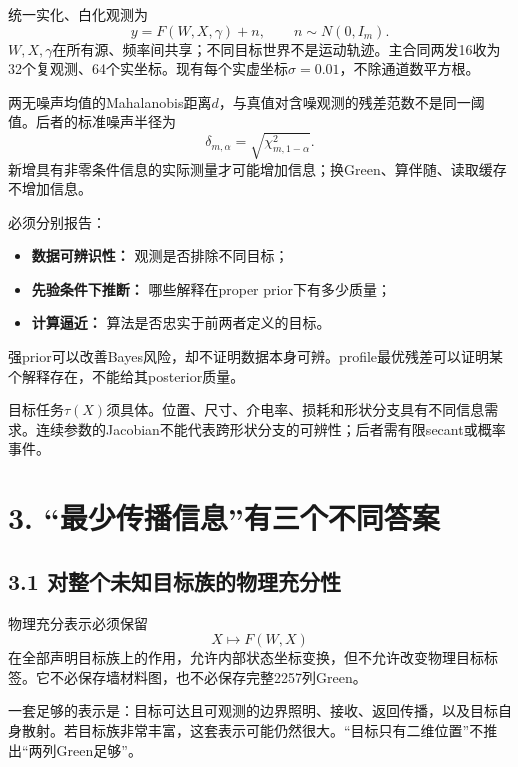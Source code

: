 \documentclass[
  10pt,
  a4paper,
]{article}
\providecommand{\tightlist}{%
  \setlength{\itemsep}{0pt}\setlength{\parskip}{0pt}}
\providecommand{\tightlist}{\setlength{\itemsep}{1pt}\setlength{\parskip}{1pt}}
\begin{document}
统一实化、白化观测为 \[
y=F(W,X,\gamma)+n,\qquad n\sim N(0,I_m).
\]
\(W,X,\gamma\)在所有源、频率间共享；不同目标世界不是运动轨迹。主合同两发16收为32个复观测、64个实坐标。现有每个实虚坐标\(\sigma=0.01\)，不除通道数平方根。

两无噪声均值的Mahalanobis距离\(d\)，与真值对含噪观测的残差范数不是同一阈值。后者的标准噪声半径为
\[
\delta_{m,\alpha}=\sqrt{\chi^2_{m,1-\alpha}}.
\]
新增具有非零条件信息的实际测量才可能增加信息；换Green、算伴随、读取缓存不增加信息。

必须分别报告：

\begin{itemize}
\tightlist
\item
  \textbf{数据可辨识性：} 观测是否排除不同目标；
\item
  \textbf{先验条件下推断：} 哪些解释在proper prior下有多少质量；
\item
  \textbf{计算逼近：} 算法是否忠实于前两者定义的目标。
\end{itemize}

强prior可以改善Bayes风险，却不证明数据本身可辨。profile最优残差可以证明某个解释存在，不能给其posterior质量。

目标任务\(\tau(X)\)须具体。位置、尺寸、介电率、损耗和形状分支具有不同信息需求。连续参数的Jacobian不能代表跨形状分支的可辨性；后者需有限secant或概率事件。

\hypertarget{ux6700ux5c11ux4f20ux64adux4fe1ux606fux6709ux4e09ux4e2aux4e0dux540cux7b54ux6848}{%
\section{3.
``最少传播信息''有三个不同答案}\label{ux6700ux5c11ux4f20ux64adux4fe1ux606fux6709ux4e09ux4e2aux4e0dux540cux7b54ux6848}}

\hypertarget{ux5bf9ux6574ux4e2aux672aux77e5ux76eeux6807ux65cfux7684ux7269ux7406ux5145ux5206ux6027}{%
\subsection{3.1
对整个未知目标族的物理充分性}\label{ux5bf9ux6574ux4e2aux672aux77e5ux76eeux6807ux65cfux7684ux7269ux7406ux5145ux5206ux6027}}

物理充分表示必须保留 \[
X\longmapsto F(W,X)
\]
在全部声明目标族上的作用，允许内部状态坐标变换，但不允许改变物理目标标签。它不必保存墙材料图，也不必保存完整2257列Green。

一套足够的表示是：目标可达且可观测的边界照明、接收、返回传播，以及目标自身散射。若目标族非常丰富，这套表示可能仍然很大。``目标只有二维位置''不推出``两列Green足够''。
\end{document}
